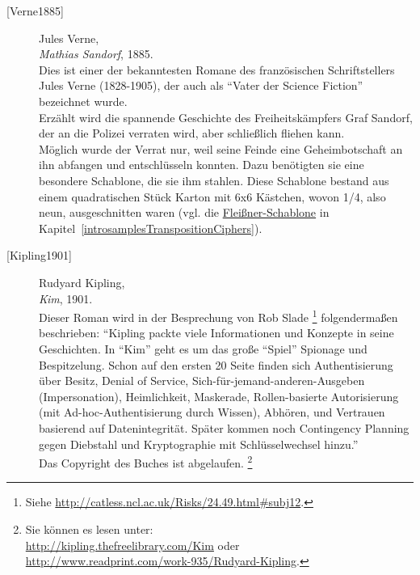 \begin{refsegment}
\begin{description}
\item[\textrm{[Verne1885]}] 
    Jules Verne, \\
    {\em Mathias Sandorf}, 1885. \\
    Dies ist einer der bekanntesten Romane des französischen Schriftstellers
    Jules Verne (1828-1905), der auch als "`Vater der Science Fiction"'
    bezeichnet wurde.\\
    Erzählt wird die spannende Geschichte des Freiheitskämpfers Graf
    Sandorf, der an die Polizei verraten wird, aber schließlich fliehen
    kann.\\
    Möglich wurde der Verrat nur, weil seine Feinde eine Geheimbotschaft an
    ihn abfangen und entschlüsseln konnten. Dazu benötigten sie eine
    besondere Schablone, die sie ihm stahlen. Diese Schablone bestand aus
    einem quadratischen Stück Karton mit 6x6 Kästchen, wovon 1/4, also neun,
    ausgeschnitten waren (vgl. die
    \hyperlink{turning-grille-cipher}{Fleißner-Schablone}
    in Kapitel~\ref{introsamplesTranspositionCiphers}).\\


\item[\textrm{[Kipling1901]}] 
    Rudyard Kipling, \\
    {\em Kim}, 1901. \\
    Dieser Roman wird in der Besprechung von Rob Slade%
    \footnote{Siehe
        \url{http://catless.ncl.ac.uk/Risks/24.49.html#subj12}.
    }
    folgendermaßen beschrieben:
    "`Kipling packte viele Informationen und Konzepte in seine Geschichten.
    In "`Kim"' geht es um das große "`Spiel"' Spionage und Bespitzelung.
    Schon auf den ersten 20 Seite finden sich Authentisierung über Besitz,
    Denial of Service, Sich-für-jemand-anderen-Ausgeben (Impersonation),
    Heimlichkeit, Maskerade, Rollen-basierte Autorisierung (mit
    Ad-hoc-Authentisierung durch Wissen), Abhören, und Vertrauen basierend
    auf Datenintegrität.
    Später kommen noch Contingency Planning gegen Diebstahl und
    Kryptographie mit Schlüsselwechsel hinzu."'\\
    Das Copyright des Buches ist abgelaufen.%
    \footnote{Sie können es lesen unter:\\
          \url{http://kipling.thefreelibrary.com/Kim} oder\\
          \url{http://www.readprint.com/work-935/Rudyard-Kipling}.
    }\\



\end{description}
\end{refsegment}
